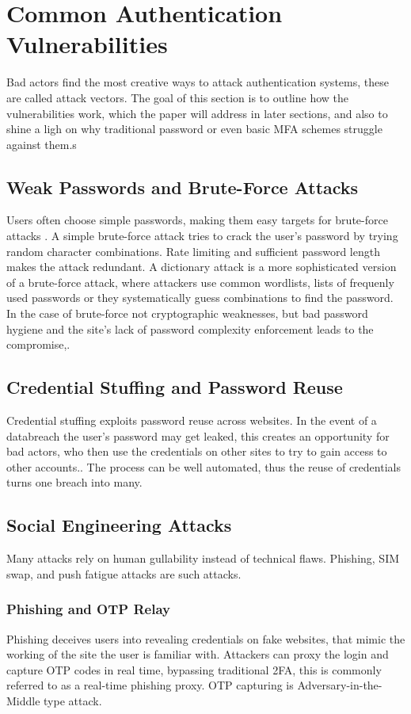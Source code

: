 

\section{Common Authentication Vulnerabilities}\label{sec:common-vulnerabilities}
Bad actors find the most creative ways to attack authentication systems, these are called attack vectors. The goal of this section is to outline how the vulnerabilities work, which the paper will address in later sections, and also to shine a ligh on why traditional password or even basic MFA schemes struggle against them.s


\subsection{Weak Passwords and Brute-Force Attacks}
Users often choose simple passwords, making them easy targets for brute-force attacks \cite{Ma2022ProspectsPassword}. A simple brute-force attack tries to crack the user's password by trying random character combinations. Rate limiting and sufficient password length makes the attack redundant. A dictionary attack is a more sophisticated version of a brute-force attack, where attackers use common wordlists, lists of frequenly used passwords or they systematically guess combinations to find the password. In the case of brute-force not cryptographic weaknesses, but bad password hygiene and the site's lack of password complexity enforcement leads to the compromise,.


\subsection{Credential Stuffing and Password Reuse}
Credential stuffing exploits password reuse across websites. In the event of a databreach the user's password may get leaked, this creates an opportunity for bad actors, who then use the credentials on other sites to try to gain access to other accounts.\cite{Nisenoff2023PasswordReuse}. The process can be well automated, thus the reuse of credentials turns one breach into many.


\subsection{Social Engineering Attacks}
Many attacks rely on human gullability instead of technical flaws. Phishing, SIM swap, and push fatigue attacks are such attacks.


\subsubsection{Phishing and OTP Relay}
Phishing deceives users into revealing credentials on fake websites, that mimic the working of the site the user is familiar with. Attackers can proxy the login and capture OTP codes in real time, bypassing traditional 2FA, this is commonly referred to as a real-time phishing proxy. OTP capturing is Adversary-in-the-Middle type attack\cite{Kasemodel2025BlueTOTP}.

